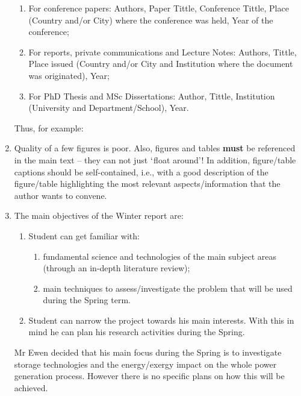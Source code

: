 \documentclass[14pt,twoside]{report}
\begin{document}
\begin{enumerate}
\begin{enumerate}
\item For conference papers: Authors, Paper Tittle, Conference Tittle, Place (Country and/or City) where the conference was held, Year of the conference;
\item For reports,  private communications and Lecture Notes: Authors, Tittle, Place issued (Country and/or City and Institution where the document was originated), Year;
\item For PhD Thesis and MSc Dissertations: Author, Tittle, Institution (University and Department/School), Year.
\end{enumerate}  
Thus, for example:
%
\item Quality of a few figures is poor. Also, figures and tables {\bf must} be referenced in the main text -- they can not just $\lq$float around'! In addition, figure/table captions should be self-contained, i.e., with a good description of the figure/table highlighting the most relevant aspects/information that the author wants to convene. 
% 
\item The main objectives of the Winter report are:
\begin{enumerate} 
\item Student can get familiar with:    
\begin{enumerate}
\item fundamental science and technologies of the main subject areas (through an in-depth literature review);
\item main techniques to assess/investigate the problem that will be used during the Spring term.
\end{enumerate}
\item Student can narrow the project towards his main interests. With this in mind he can plan his research activities during the Spring.
\end{enumerate}
Mr Ewen decided that his main focus during the Spring is to investigate storage technologies and the energy/exergy impact on the whole power generation process. However there is no specific plans on how this will be achieved.
% 
\end{enumerate}
\end{document}
